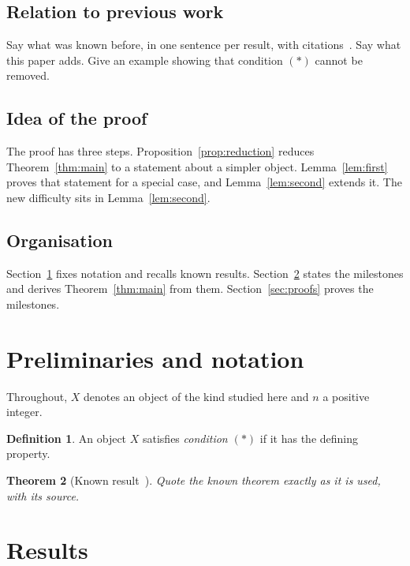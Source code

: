 \documentclass{amsart}
\theoremstyle{plain}
\newtheorem{theorem}{Theorem}[section]
\theoremstyle{definition}
\newtheorem{definition}[theorem]{Definition}
\theoremstyle{remark}
\begin{document}
\subsection{Relation to previous work}\label{subsec:previous}
Say what was known before, in one sentence per result, with citations~\cite{ref:first}.
Say what this paper adds. Give an example showing that condition $(\ast)$ cannot be removed.

\subsection{Idea of the proof}\label{subsec:idea}
The proof has three steps. Proposition~\ref{prop:reduction} reduces Theorem~\ref{thm:main}
to a statement about a simpler object. Lemma~\ref{lem:first} proves that statement for a
special case, and Lemma~\ref{lem:second} extends it. The new difficulty sits in
Lemma~\ref{lem:second}.

\subsection{Organisation}\label{subsec:organisation}
Section~\ref{sec:prelim} fixes notation and recalls known results.
Section~\ref{sec:results} states the milestones and derives Theorem~\ref{thm:main} from them.
Section~\ref{sec:proofs} proves the milestones.

\section{Preliminaries and notation}\label{sec:prelim}
Throughout, $X$ denotes an object of the kind studied here and $n$ a positive integer.

\begin{definition}\label{def:object}
An object $X$ satisfies \emph{condition $(\ast)$} if it has the defining property.
\end{definition}

\begin{theorem}[Known result~\cite{ref:second}]\label{thm:known}
Quote the known theorem exactly as it is used, with its source.
\end{theorem}

\section{Results}\label{sec:results}
\end{document}
